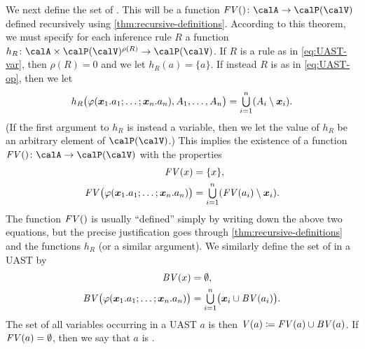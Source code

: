 \documentclass[a4paper, 11pt, article, danish, oneside]{memoir}
\DeclarePairedDelimiter{\auxdelimparen}{(}{)}
\newcommand{\powerset}[2][]{\calP\auxdelimparen[#1]{#2}}
\newcommand*\union\cup
\DeclareMathOperator*{\smallbigcup}{\textstyle\bigcup}
\DeclareMathOperator*{\bigunion}{\mathchoice
    {\smallbigcup}%
    {\bigcup}%
    {\bigcup}%
    {\bigcup}%
}
\newcommand{\defeq}{\coloneqq}
\renewcommand{\phi}{\varphi}
\newcommand{\newpar}{\paragraph{}}
\renewcommand{\prod}{\times}
\newcommand{\setVar}{\calV}
\newcommand{\freevar}[2][]{\mathit{FV}\auxdelimparen[#1]{#2}}
\newcommand{\boundvar}[2][]{\mathit{BV}\auxdelimparen[#1]{#2}}
\newcommand{\allvar}[2][]{\mathit{V}\auxdelimparen[#1]{#2}}
\begin{document}
We next define the set of . This will be a function $\freevar{} \colon \calA \to \powerset{\setVar}$ defined recursively using \cref{thm:recursive-definitions}. According to this theorem, we must specify for each inference rule $R$ a function $h_R \colon \calA \prod \powerset{\setVar}^{\rho(R)} \to \powerset{\setVar}$. If $R$ is a rule as in \cref{eq:UAST-var}, then $\rho(R) = 0$ and we let $h_R(a) = \{a\}$. If instead $R$ is as in \cref{eq:UAST-op}, then we let
%
\begin{equation*}
    h_R \bigl( \phi(\seq{x}_1.a_1 ; \ldots ; \seq{x}_n.a_n), A_1, \ldots, A_n \bigr)
        = \bigunion_{i=1}^n (A_i \setminus \seq{x}_i).
\end{equation*}
%
(If the first argument to $h_R$ is instead a variable, then we let the value of $h_R$ be an arbitrary element of $\powerset{\setVar}$.) This implies the existence of a function $\freevar{} \colon \calA \to \powerset{\setVar}$ with the properties
%
\begin{align*}
    \freevar{x}
        &= \{x\}, \\
    \freevar[\big]{\phi(\seq{x}_1.a_1 ; \ldots ; \seq{x}_n.a_n)}
        &= \bigunion_{i=1}^n (\freevar{a_i} \setminus \seq{x}_i).
\end{align*}
%
The function $\freevar{}$ is usually \enquote{defined} simply by writing down the above two equations, but the precise justification goes through \cref{thm:recursive-definitions} and the functions $h_R$ (or a similar argument). We similarly define the set of  in a UAST by
%
\begin{align*}
    \boundvar{x}
        &= \emptyset, \\
    \boundvar[\big]{\phi(\seq{x}_1.a_1 ; \ldots ; \seq{x}_n.a_n)}
        &= \bigunion_{i=1}^n \bigl( \seq{x}_i \union \boundvar{a_i} \bigr).
\end{align*}
%
The set of all variables occurring in a UAST $a$ is then $\allvar{a} \defeq \freevar{a} \union \boundvar{a}$. If $\freevar{a} = \emptyset$, then we say that $a$ is .


\newpar
\end{document}
